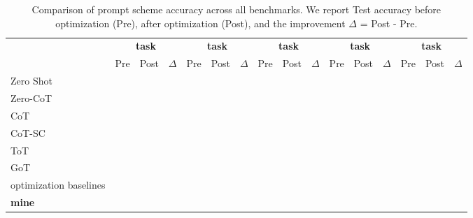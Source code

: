 \begin{table}[t]
    \centering
    \caption{Comparison of prompt scheme accuracy across all benchmarks. We report Test accuracy before optimization (Pre), after optimization (Post), and the improvement $\Delta$ = Post - Pre.}
    \label{tab:full}
    \vspace{1mm}
    \begin{tabular}{lccccccccccccccc}
    \toprule
    & \multicolumn{3}{c}{\textbf{task}} & \multicolumn{3}{c}{\textbf{task}} & \multicolumn{3}{c}{\textbf{task}} & \multicolumn{3}{c}{\textbf{task}} & \multicolumn{3}{c}{\textbf{task}}\\
     \cmidrule(lr){2-4} \cmidrule(lr){5-7} \cmidrule(lr){8-10} \cmidrule(lr){11-13} \cmidrule(lr){14-16}
    & Pre & Post & $\Delta$ & Pre & Post & $\Delta$ & Pre & Post & $\Delta$ & Pre & Post & $\Delta$ & Pre & Post & $\Delta$ \\
    \midrule
    Zero Shot\\
    Zero-CoT\\
    CoT\\
    CoT-SC\\
    ToT\\
    GoT\\
    \midrule
    optimization baselines\\
    \midrule
    \textbf{mine} &\\
    \bottomrule
    \end{tabular}
\end{table}

